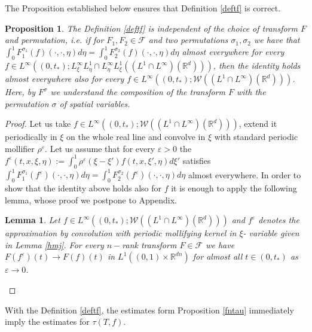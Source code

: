 \documentclass[10pt]{article}
\newtheorem{prop}{Proposition}
\newtheorem{lemma}{Lemma}
\newcommand{\ve}{\varepsilon}
\newcommand{\R}{\mathbb{R}}
\newcommand{\izj}{\int_{0}^{1}}
\newcommand{\W}{\mathcal{W}}
\begin{document}
The Proposition established below ensures that Definition \ref{deftf} is correct.  

 \begin{prop}\label{deftfprop}
     The Definition \ref{deftf} is independent of the choice of transform $F$ and permutation, i.e. if for $F_1,F_2 \in \mathcal{F}$ and two permutations $ \sigma_1,\sigma_2$ we have that $\izj F_1^{\sigma_1}(f)(\cdot,\cdot,\eta)d\eta = \izj F_2^{\sigma_2}(f)(\cdot,\cdot,\eta)d\eta$ almost everywhere for every $f\in L^\infty((0,t_{*});L^{\infty}_\xi L^1_\eta \cap L^{\infty}_\eta L^1_\xi((L^1\cap L^{\infty})(\R^d)))$, then the identity  holds almost everywhere also for every $f\in L^\infty((0,t_{*});\W((L^1\cap L^{\infty})(\R^d)))$. Here, by $F^{\sigma}$ we understand the composition of the transform $F$ with the permutation $\sigma$ of spatial variables. 
\end{prop}

\begin{proof}
Let us take $f\in L^\infty((0,t_{*});\W((L^1\cap L^{\infty})(\R^d)))$, extend it periodically in $\xi$  on the whole real line and convolve in $\xi$ with standard periodic mollifier  $\rho^\ve$. Let us assume that for every $\ve > 0$ the $f^\ve(t,x,\xi,\eta):= \izj \rho^{\ve}(\xi-\xi')f(t,x,\xi',\eta)d\xi'$ satisfies $\izj F_1^{\sigma_1}(f^\ve)(\cdot,\cdot,\eta)d\eta = \izj F_2^{\sigma_2}(f^\ve)(\cdot,\cdot,\eta)d\eta$ almost everywhere.
In order to show that the identity above holds also for $f$ it is enough to apply the following lemma, whose proof we postpone to Appendix.
\begin{lemma}\label{apro}
Let $f\in L^\infty((0,t_{*});\W((L^1\cap L^{\infty})(\R^d)))$ and $f^\ve$ denotes the approximation by convolution with periodic mollifying kernel in $\xi$- variable given in Lemma \ref{hmj}. For every $n-$rank transform  $F \in \mathcal{F}$ we have $ F(f^\ve)(t) \rightarrow  F(f)(t)$ in $L^{1}((0,1)\times\R^{dn})$ for almost all $t \in (0,t_{*})$ as $\ve \rightarrow 0$.
\end{lemma}

\end{proof}

With the Definition \ref{deftf}, the estimates form Proposition \ref{fntau} immediately imply the estimates for $\tau(T,f)$.
\end{document}
